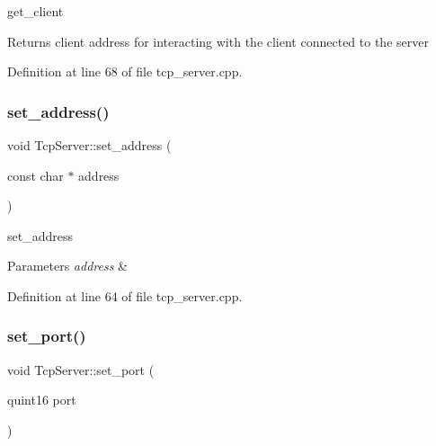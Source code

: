 get\+\_\+client 

\begin{DoxyReturn}{Returns}
client address for interacting with the client connected to the server 
\end{DoxyReturn}


Definition at line 68 of file tcp\+\_\+server.\+cpp.


\begin{DoxyCode}{0}

\end{DoxyCode}
\mbox{\label{class_tcp_server_a3496c0dfa5e3c1cb5bf794739508eda4}} 
\subsubsection{\texorpdfstring{set\_address()}{set\_address()}}
{\footnotesize\ttfamily void Tcp\+Server\+::set\+\_\+address (\begin{DoxyParamCaption}\item[{const char $\ast$}]{address }\end{DoxyParamCaption})}



set\+\_\+address 


\begin{DoxyParams}{Parameters}
{\em address} & \\
\hline
\end{DoxyParams}


Definition at line 64 of file tcp\+\_\+server.\+cpp.


\begin{DoxyCode}{0}

\end{DoxyCode}
\mbox{\label{class_tcp_server_aaf6005b12641ab81bcf91099d9255437}} 
\subsubsection{\texorpdfstring{set\_port()}{set\_port()}}
{\footnotesize\ttfamily void Tcp\+Server\+::set\+\_\+port (\begin{DoxyParamCaption}\item[{quint16}]{port }\end{DoxyParamCaption})}



